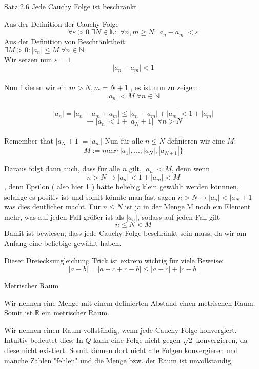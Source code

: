 \documentclass[smallheadings,headsepline,12pt,a4paper]{scrartcl}
\begin{document}
\newpage
\begin{center}
\item[Satz 2.6 Jede Cauchy Folge ist beschränkt]
\end{center}
\item Aus der Definition der Cauchy Folge 
$$ \forall \varepsilon > 0 \; \exists N \in \mathbb{N} : \; \forall n,m \geq N : |a_n-a_m| < \varepsilon $$
Aus der Definition von Beschränktheit: \\
$\exists M >0 : |a_n |\leq M \; \forall n \in \mathbb{N} $\\
Wir setzen nun $\varepsilon=1$ \\
$$ |a_n-a_m| < 1 $$ \\
Nun fixieren wir ein $m>N, m = N+1 $ , es ist nun zu zeigen:$$ |a_n | < M \; \forall n \in \mathbb{N} $$ \\

$$ |a_n | = |a_n-a_m+a_m| \leq |a_n -a_m| + |a_m | < 1 + |a_m | $$
$$ \rightarrow |a_n| < 1 +  |a_N+1 | \; \; \forall n > N $$ \\

Remember that $|a_N+1| = |a_m|$
Nun für alle $n \leq N $ definieren wir eine $M$: 
$$ M:= max\{|a_1|,...,|a_N|,|a_{N+1}| \} $$

\newpage


Daraus folgt dann auch, dass für alle $n$ gilt, $|a_n | < M $, denn wenn $$n>N \rightarrow |a_n| < 1 +  |a_m | < M $$, denn Epsilon ( also hier 1 ) hätte beliebig klein gewählt werden könnnen, solange es positiv ist und somit könnte man fast sagen $ n>N \rightarrow |a_n| <   |a_N+1| $ was dies deutlicher macht. Für $n \leq N $ ist ja in der Menge M noch ein Element mehr, was auf jeden Fall größer ist als $|a_n|$, sodass auf jeden Fall gilt \\
$$n \leq N < M $$
Damit ist bewiesen, dass jede Cauchy Folge beschränkt sein muss, da wir am Anfang eine beliebige gewählt haben. \\

\item Dieser Dreiecksungleichung Trick ist extrem wichtig für viele Beweise:
$$ |a-b| = |a-c+c-b| \leq |a-c| + |c-b| $$

\begin{center}
\item[Metrischer Raum]
\end{center}
\item Wir nennen eine Menge mit einem definierten Abstand einen metrischen Raum. Somit ist $\mathbb{R}$ ein metrischer Raum. 
\item Wir nennen einen Raum vollständig, wenn jede Cauchy Folge konvergiert. Intuitiv bedeutet dies: In $Q$ kann eine Folge nicht gegen $\sqrt{2}$ konvergieren, da diese nicht existiert. Somit können dort nicht alle Folgen konvergieren und manche Zahlen "fehlen" und die Menge bzw. der Raum ist unvollständig. \\
\end{document}
